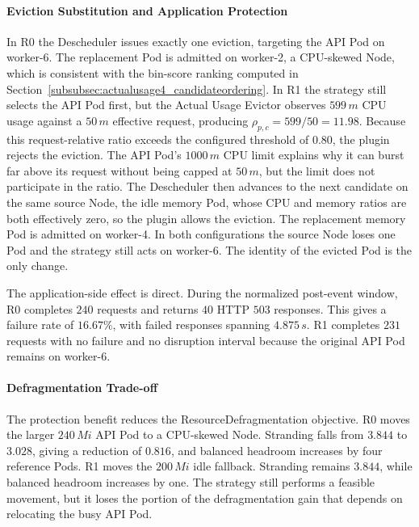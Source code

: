 \paragraph{Eviction Substitution and Application Protection}
\label{subsubsec:actualusage4_substitution}

In R0 the Descheduler issues exactly one eviction, targeting the API Pod on worker-6. The replacement Pod is admitted on worker-2, a CPU-skewed Node, which is consistent with the bin-score ranking computed in Section~\ref{subsubsec:actualusage4_candidateordering}. In R1 the strategy still selects the API Pod first, but the Actual Usage Evictor observes \(599\,m\) CPU usage against a \(50\,m\) effective request, producing \(\rho_{p,c}=599/50=11.98\). Because this request-relative ratio exceeds the configured threshold of \(0.80\), the plugin rejects the eviction. The API Pod's \(1000\,m\) CPU limit explains why it can burst far above its request without being capped at \(50\,m\), but the limit does not participate in the ratio. The Descheduler then advances to the next candidate on the same source Node, the idle memory Pod, whose CPU and memory ratios are both effectively zero, so the plugin allows the eviction. The replacement memory Pod is admitted on worker-4. In both configurations the source Node loses one Pod and the strategy still acts on worker-6. The identity of the evicted Pod is the only change.

The application-side effect is direct. During the normalized post-event window, R0 completes \(240\) requests and returns \(40\) HTTP \(503\) responses. This gives a failure rate of \(16.67\%\), with failed responses spanning \(4.875\,s\). R1 completes \(231\) requests with no failure and no disruption interval because the original API Pod remains on worker-6.

\paragraph{Defragmentation Trade-off}
\label{subsubsec:actualusage4_strandingtradeoff}

The protection benefit reduces the ResourceDefragmentation objective. R0 moves the larger \(240\,Mi\) API Pod to a CPU-skewed Node. Stranding falls from \(3.844\) to \(3.028\), giving a reduction of \(0.816\), and balanced headroom increases by four reference Pods. R1 moves the \(200\,Mi\) idle fallback. Stranding remains \(3.844\), while balanced headroom increases by one. The strategy still performs a feasible movement, but it loses the portion of the defragmentation gain that depends on relocating the busy API Pod.

